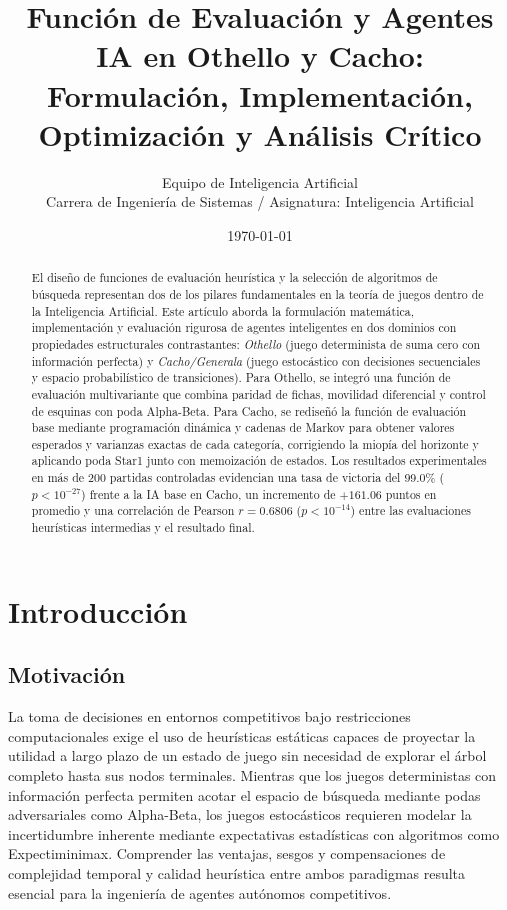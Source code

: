 \documentclass[10pt, a4paper]{article}
\title{Función de Evaluación y Agentes IA en Othello y Cacho: \\
Formulación, Implementación, Optimización y Análisis Crítico}
\author{Equipo de Inteligencia Artificial \\ Carrera de Ingeniería de Sistemas / Asignatura: Inteligencia Artificial}
\date{\today}
\begin{document}
\maketitle

\begin{abstract}
El diseño de funciones de evaluación heurística y la selección de algoritmos de búsqueda representan dos de los pilares fundamentales en la teoría de juegos dentro de la Inteligencia Artificial. Este artículo aborda la formulación matemática, implementación y evaluación rigurosa de agentes inteligentes en dos dominios con propiedades estructurales contrastantes: \emph{Othello} (juego determinista de suma cero con información perfecta) y \emph{Cacho/Generala} (juego estocástico con decisiones secuenciales y espacio probabilístico de transiciones). Para Othello, se integró una función de evaluación multivariante que combina paridad de fichas, movilidad diferencial y control de esquinas con poda Alpha-Beta. Para Cacho, se rediseñó la función de evaluación base mediante programación dinámica y cadenas de Markov para obtener valores esperados y varianzas exactas de cada categoría, corrigiendo la miopía del horizonte y aplicando poda Star1 junto con memoización de estados. Los resultados experimentales en más de 200 partidas controladas evidencian una tasa de victoria del 99.0\% ($p < 10^{-27}$) frente a la IA base en Cacho, un incremento de $+161.06$ puntos en promedio y una correlación de Pearson $r = 0.6806$ ($p < 10^{-14}$) entre las evaluaciones heurísticas intermedias y el resultado final.
\end{abstract}

\section{Introducción}

\subsection{Motivación}
La toma de decisiones en entornos competitivos bajo restricciones computacionales exige el uso de heurísticas estáticas capaces de proyectar la utilidad a largo plazo de un estado de juego sin necesidad de explorar el árbol completo hasta sus nodos terminales. Mientras que los juegos deterministas con información perfecta permiten acotar el espacio de búsqueda mediante podas adversariales como Alpha-Beta, los juegos estocásticos requieren modelar la incertidumbre inherente mediante expectativas estadísticas con algoritmos como Expectiminimax. Comprender las ventajas, sesgos y compensaciones de complejidad temporal y calidad heurística entre ambos paradigmas resulta esencial para la ingeniería de agentes autónomos competitivos.
\end{document}
